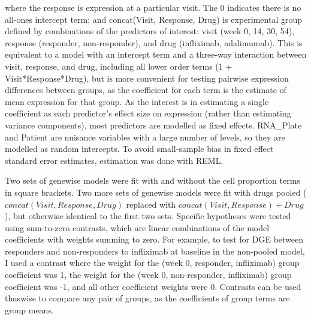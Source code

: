 \begin{outline}
where the response is expression at a particular visit.
The 0 indicates there is no all-ones intercept term;
and concat(Visit, Response, Drug) is experimental group defined by combinations of the predictors of interest:
    visit (week 0, 14, 30, 54), 
    response (responder, non-responder), 
    and drug (infliximab, adalimumab).
This is equivalent to a model with an intercept term and a three-way interaction between visit, response, and drug,
including all lower order terms (1 + Visit*Response*Drug),
but is more convenient for testing pairwise expression differences between groups,
as the coefficient for each term is the estimate of mean expression for that group.
As the interest is in estimating a single coefficient as each predictor's effect size on expression (rather than estimating variance components), 
most predictors are modelled as fixed effects.
RNA\_Plate and Patient are nuisance variables with a large number of levels, so they are modelled as random intercepts.
%
To avoid small-sample bias in fixed effect standard error estimates, estimation was done with \gls{REML}\autocite{mcneish2017SmallSampleMethods}.

Two sets of genewise models were fit with and without the cell proportion terms in square brackets.
Two more sets of genewise models were fit with drugs pooled ($concat(Visit, Response, Drug)$ replaced with $concat(Visit, Response) + Drug$),
but otherwise identical to the first two sets.
Specific hypotheses were tested using sum-to-zero contrasts, which are linear combinations of the model coefficients with weights summing to zero.
For example, to test for \gls{DGE} between responders and non-responders to infliximab at baseline in the non-pooled model,
I used a contrast where
the weight for the (week 0, responder, infliximab) group coefficient was 1,
the weight for the (week 0, non-responder, infliximab) group coefficient was -1,
and all other coefficient weights were 0.
Contrasts can be used thuswise to compare any pair of groups, as the coefficients of group terms are group means.


\end{outline}

